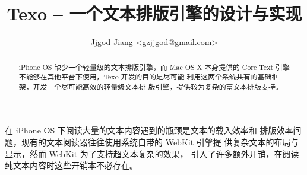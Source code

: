 \documentclass[nofonts]{ctexart}
\title{Texo -- 一个文本排版引擎的设计与实现}
\author{Jjgod Jiang <gzjjgod@gmail.com>}
\begin{document}
\maketitle

\begin{abstract}
iPhone OS 缺少一个轻量级的文本排版引擎，而 Mac OS X 本身提供的
Core Text 引擎不能够在其他平台下使用，Texo 开发的目的是尽可能
利用这两个系统共有的基础框架，开发一个尽可能高效的轻量级文本排
版引擎，提供较为复杂的富文本排版支持。
\end{abstract}

在 iPhone OS 下阅读大量的文本内容遇到的瓶颈是文本的载入效率和
排版效率问题，现有的文本阅读器往往使用系统自带的 WebKit 引擎提
供复杂文本的布局与显示，然而 WebKit 为了支持超文本复杂的效果，
引入了许多额外开销，在阅读纯文本内容时这些开销本不必存在。
\end{document}

